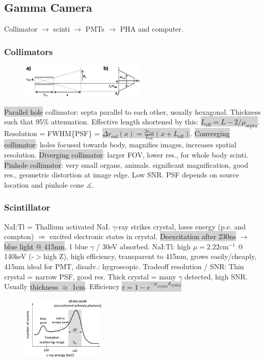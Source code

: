 \documentclass[9pt]{article}
\newcommand{\grey}[1]{\setlength{\fboxsep}{0pt}\colorbox{lightgrey}{#1}}
\begin{document}
\begin{multicols}{2}
\subsection{Gamma Camera}
Collimator $\rightarrow$ scinti $\rightarrow$ PMTs $\rightarrow$ PHA and computer.
\subsubsection{Collimators} 
\begin{figure}
	\vspace{-4mm}
	\includegraphics[width=6cm]{collimator.png}
\end{figure}
\grey{Parallel hole} collimator: septa parallel to each other, usually hexagonal. Thickness such that 95\% attenuation. Effective length shortened by this: \grey{$L_\mathrm{eff} = L - 2 / \mu_\mathrm{septa}$}. Resolution = FWHM\{PSF\} = \grey{$\Delta r_\mathrm{col}(x) = \frac{2r_\mathrm{col}}{L_\mathrm{eff}}(x + L_\mathrm{eff})$}.
\grey{Converging collimator}: holes focused towards body, magnifies images, increases spatial resolution.
\grey{Diverging collimator}: larger FOV, lower res., for whole body scinti.
\grey{Pinhole collimator}: very small organs, animals. significant magnification, good res., geometric distortion at image edge. Low SNR. PSF depends on source location and pinhole cone $\measuredangle$.

\subsubsection{Scintillator} NaI:Tl = Thallium activated NaI. $\gamma$-ray strikes crystal, loses energy (p.e. and compton) $\Rightarrow$ excited electronic states in crystal. \grey{Deexcitation after 230ns} $\rightarrow$ \grey{blue light @ 415nm}, 1 blue $\gamma$ / 30eV absorbed. NaI:Tl: high $\mu=2.22\mathrm{cm^{-1}}$ @ 140keV (-$>$high Z), high efficiency, transparent to 415nm, grows easily/cheaply, 415nm ideal for PMT, disadv.: hygroscopic. Tradeoff resolution / SNR: Thin crystal = narrow PSF, good res. Thick crystal = many $\gamma$ detected, high SNR. Usually \grey{thickness $\approx$ 1cm}. Efficiency \grey{$\varepsilon = 1-e^{-\mu_\mathrm{crystal}d_\mathrm{crystal}}$}

\begin{figure}
	\vspace{-4mm}
	\includegraphics[width=4cm]{nuclearImagingCurve.png}
\end{figure}

\end{multicols}
\end{document}
